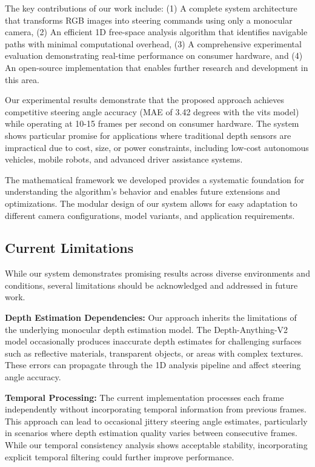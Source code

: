 \documentclass[conference]{IEEEtran}
\begin{document}
The key contributions of our work include: (1) A complete system architecture that transforms RGB images into steering commands using only a monocular camera, (2) An efficient 1D free-space analysis algorithm that identifies navigable paths with minimal computational overhead, (3) A comprehensive experimental evaluation demonstrating real-time performance on consumer hardware, and (4) An open-source implementation that enables further research and development in this area.

Our experimental results demonstrate that the proposed approach achieves competitive steering angle accuracy (MAE of 3.42 degrees with the vits model) while operating at 10-15 frames per second on consumer hardware. The system shows particular promise for applications where traditional depth sensors are impractical due to cost, size, or power constraints, including low-cost autonomous vehicles, mobile robots, and advanced driver assistance systems.

The mathematical framework we developed provides a systematic foundation for understanding the algorithm's behavior and enables future extensions and optimizations. The modular design of our system allows for easy adaptation to different camera configurations, model variants, and application requirements.

\subsection{Current Limitations}
While our system demonstrates promising results across diverse environments and conditions, several limitations should be acknowledged and addressed in future work.

\textbf{Depth Estimation Dependencies:} Our approach inherits the limitations of the underlying monocular depth estimation model. The Depth-Anything-V2 model occasionally produces inaccurate depth estimates for challenging surfaces such as reflective materials, transparent objects, or areas with complex textures. These errors can propagate through the 1D analysis pipeline and affect steering angle accuracy.

\textbf{Temporal Processing:} The current implementation processes each frame independently without incorporating temporal information from previous frames. This approach can lead to occasional jittery steering angle estimates, particularly in scenarios where depth estimation quality varies between consecutive frames. While our temporal consistency analysis shows acceptable stability, incorporating explicit temporal filtering could further improve performance.
\end{document}
